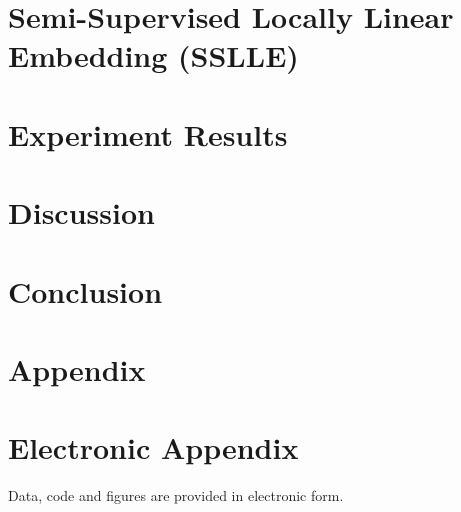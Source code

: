 \documentclass[12pt]{article}
\begin{document}
\section{Semi-Supervised Locally Linear Embedding (SSLLE)}
\label{sslle}


\section{Experiment Results}
\label{experiment}


\section{Discussion}
\label{discussion}


\section{Conclusion}
\label{concl}


\newpage

    


\setcounter{page}{5}

\appendix

\section{Appendix}
\label{app}

\newpage

\section{Electronic Appendix}
\label{el_app}

Data, code and figures are provided in electronic form.

\newpage
    
\end{document}
